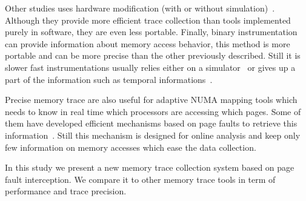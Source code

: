 Other studies uses hardware modification (with or without
simulation)~\cite{Bao08HMTT,Martonosi92MemSpy}.  Although they provide more
efficient trace collection than tools implemented purely in software, they are
even less portable.
Finally, binary instrumentation can provide information about memory access
behavior, this method is more portable and can be more
precise than the other previously described. Still it is slower fast
instrumentations usually relies either on a simulator~\cite{DeRose02SIGMA} or
gives up a part of the information such as temporal
informations~\cite{Beniamine15Tabarnac}.

Precise memory trace are also useful for adaptive NUMA mapping tools which
needs to know in real time which processors are accessing which pages. Some of
them have developed efficient mechanisms based on page faults to retrieve this
information~\cite{Diener13CommunicationBased}. Still this mechanism is
designed for online analysis and keep only few information on memory accesses
which ease the data collection.

In this study we present a new memory trace collection system based on page
fault interception. We compare it to other memory trace tools in term of
performance and trace precision.

